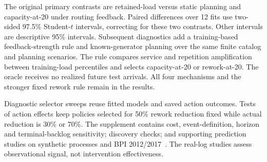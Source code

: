 The original primary contrasts are retained-load versus static planning and capacity-at-20 under routing feedback. Paired differences over 12 fits use two-sided 97.5\% Student-$t$ intervals, correcting for these two contrasts. Other intervals are descriptive 95\% intervals. Subsequent diagnostics add a training-based feedback-strength rule and known-generator planning over the same finite catalog and planning scenarios. The rule compares service and repetition amplification between training-load percentiles and selects capacity-at-20 or rework-at-20. The oracle receives no realized future test arrivals. All four mechanisms and the stronger fixed rework rule remain in the results.

Diagnostic selector sweeps reuse fitted models and saved action outcomes. Tests of action effects keep policies selected for 50\% rework reduction fixed while actual reduction is 30\% or 70\%. The supplement contains cost, event-definition, horizon and terminal-backlog sensitivity; discovery checks; and supporting prediction studies on synthetic processes and BPI 2012/2017~\cite{bpi12,bpi17}. The real-log studies assess observational signal, not intervention effectiveness.


